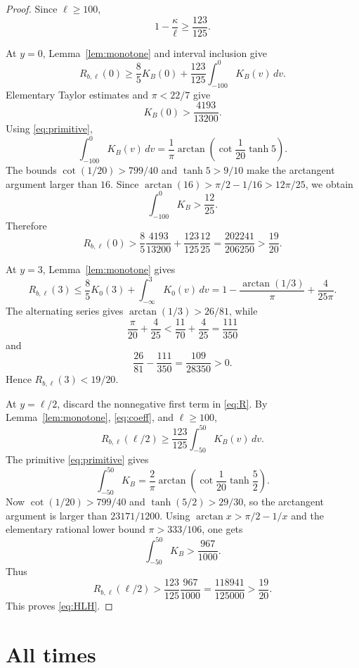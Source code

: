 \documentclass[11pt]{article}
\begin{document}
\begin{proof}
Since $\ell\ge100$,
\begin{equation}\label{eq:coeff}
 1-\frac{\kappa}{\ell}\ge\frac{123}{125}.
\end{equation}

At $y=0$, Lemma~\ref{lem:monotone} and interval inclusion give
\[
 R_{b,\ell}(0)
 \ge \frac85 K_B(0)+\frac{123}{125}\int_{-100}^0K_B(v)\,dv.
\]
Elementary Taylor estimates and $\pi<22/7$ give
\[
 K_B(0)>\frac{4193}{13200}.
\]
Using \eqref{eq:primitive},
\[
 \int_{-100}^0K_B(v)\,dv
 =\frac1\pi\arctan\!\left(\cot\frac1{20}\tanh5\right).
\]
The bounds $\cot(1/20)>799/40$ and $\tanh5>9/10$ make the arctangent argument larger than $16$. Since $\arctan(16)>\pi/2-1/16>12\pi/25$, we obtain
\[
 \int_{-100}^0K_B>\frac{12}{25}.
\]
Therefore
\begin{equation}\label{eq:high0}
 R_{b,\ell}(0)
 >\frac85\frac{4193}{13200}+\frac{123}{125}\frac{12}{25}
 =\frac{202241}{206250}>\frac{19}{20}.
\end{equation}

At $y=3$, Lemma~\ref{lem:monotone} gives
\[
 R_{b,\ell}(3)
 \le \frac85K_0(3)+\int_{-\infty}^3K_0(v)\,dv
 =1-\frac{\arctan(1/3)}\pi+\frac4{25\pi}.
\]
The alternating series gives $\arctan(1/3)>26/81$, while
\[
 \frac\pi{20}+\frac4{25}<\frac{11}{70}+\frac4{25}=\frac{111}{350}
\]
and
\[
 \frac{26}{81}-\frac{111}{350}=\frac{109}{28350}>0.
\]
Hence $R_{b,\ell}(3)<19/20$.

At $y=\ell/2$, discard the nonnegative first term in \eqref{eq:R}. By Lemma~\ref{lem:monotone}, \eqref{eq:coeff}, and $\ell\ge100$,
\[
 R_{b,\ell}(\ell/2)
 \ge\frac{123}{125}\int_{-50}^{50}K_B(v)\,dv.
\]
The primitive \eqref{eq:primitive} gives
\[
 \int_{-50}^{50}K_B
 =\frac2\pi\arctan\!\left(\cot\frac1{20}\tanh\frac52\right).
\]
Now $\cot(1/20)>799/40$ and $\tanh(5/2)>29/30$, so the arctangent argument is larger than $23171/1200$. Using $\arctan x>\pi/2-1/x$ and the elementary rational lower bound $\pi>333/106$, one gets
\[
 \int_{-50}^{50}K_B>\frac{967}{1000}.
\]
Thus
\begin{equation}\label{eq:highmid}
 R_{b,\ell}(\ell/2)
 >\frac{123}{125}\frac{967}{1000}
 =\frac{118941}{125000}>\frac{19}{20}.
\end{equation}
This proves \eqref{eq:HLH}.
\end{proof}

\section{All times}
\end{document}
